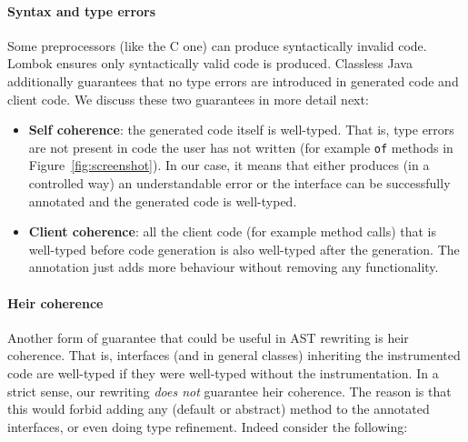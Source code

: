 


\paragraph{Syntax and type errors}
Some preprocessors (like the C one) can produce syntactically invalid code.
Lombok ensures only syntactically valid code is produced. %
Classless Java additionally guarantees that no type errors are introduced
in generated code and client code. We discuss these two guarantees in
more detail next:

\begin{itemize}

\item{\bf Self coherence}: the generated code itself is well-typed. That is,
  type errors are not present in code the user has not written (for
  example \texttt{of} methods in Figure~\ref{fig:screenshot}).
In our case, it means that either \mixin{} produces (in a controlled way) an
understandable error or the interface can be successfully annotated and the generated code is well-typed.

\item{\bf Client coherence}: all the client code (for example method calls)
  that is well-typed before code generation is also well-typed after the generation.
The annotation just adds more behaviour without removing any functionality.

\end{itemize}

\paragraph{Heir coherence} Another form of guarantee that could be
useful in AST rewriting is heir coherence. That is, interfaces
(and in general classes) inheriting the instrumented code are
well-typed if they were well-typed without the instrumentation.
In a strict sense, our rewriting \emph{does not} guarantee heir coherence.  The reason
is that this would forbid adding any (default or abstract) method to
the annotated interfaces, or even doing type refinement. Indeed consider
the following:

